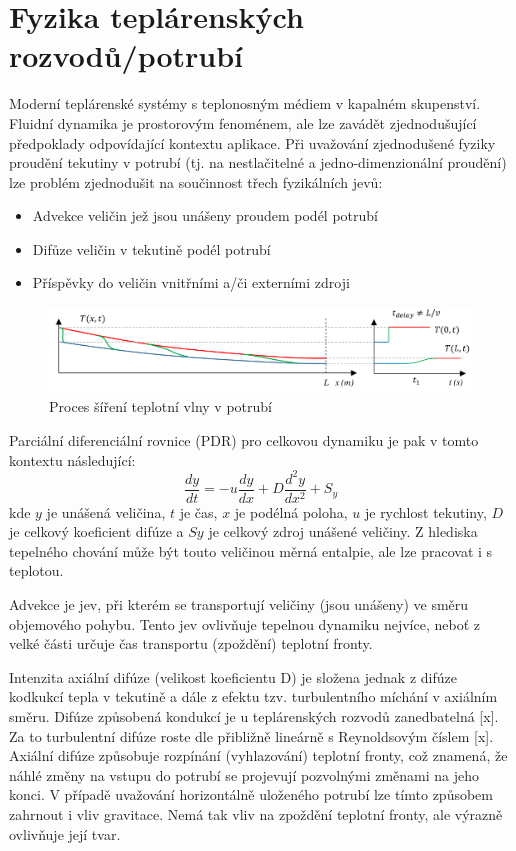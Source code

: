 \section{Fyzika teplárenských rozvodů/potrubí}
Moderní teplárenské systémy s teplonosným médiem v kapalném skupenství. Fluidní 
dynamika je prostorovým fenoménem, ale lze zavádět zjednodušující předpoklady 
odpovídající kontextu aplikace. Při uvažování zjednodušené fyziky proudění 
tekutiny v potrubí (tj. na nestlačitelné a jedno-dimenzionální proudění) lze 
problém zjednodušit na součinnost třech fyzikálních jevů:

\begin{itemize}
\item Advekce veličin jež jsou unášeny proudem podél potrubí 
\item Difůze veličin v tekutině podél potrubí
\item Příspěvky do veličin vnitřními a/či externími zdroji
\end{itemize}

\begin{figure}[h] \capstart
\includegraphics[width=\textwidth]{figures/heat_front}
\caption{Proces šíření teplotní vlny v potrubí \cite{Abraham2009}}
\end{figure}

Parciální diferenciální rovnice (PDR) pro celkovou dynamiku je pak v tomto 
kontextu následující:
\begin{equation} 
\frac{dy}{dt} = -u \frac{dy}{dx} + D\frac{d^{2}y}{dx^2} + {S_y}  
\end{equation}
kde \(y\) je unášená veličina, \(t\) je čas, \(x\) je podélná poloha, \(u\) je
rychlost tekutiny, \(D\) je celkový koeficient difúze a \(Sy\) je celkový
zdroj unášené veličiny. Z hlediska tepelného chování může být touto veličinou 
měrná entalpie, ale lze pracovat i s teplotou.

Advekce je jev, při kterém se transportují veličiny (jsou unášeny) ve směru
objemového pohybu. Tento jev ovlivňuje tepelnou dynamiku nejvíce, neboť z velké
části určuje čas transportu (zpoždění) teplotní fronty.

Intenzita axiální difúze (velikost koeficientu D) je složena jednak z difúze
kodkukcí tepla v tekutině a dále z efektu tzv. turbulentního míchání v axiálním
směru. Difúze způsobená kondukcí je u teplárenských rozvodů zanedbatelná [x].
Za to turbulentní difúze roste dle přibližně lineárně s Reynoldsovým číslem
[x].  Axiální difúze způsobuje rozpínání (vyhlazování) teplotní fronty, což
znamená, že náhlé změny na vstupu do potrubí se projevují pozvolnými změnami na
jeho konci. V případě uvažování horizontálně uloženého potrubí lze tímto
způsobem zahrnout i vliv gravitace. Nemá tak vliv na zpoždění teplotní fronty,
ale výrazně ovlivňuje její tvar.

